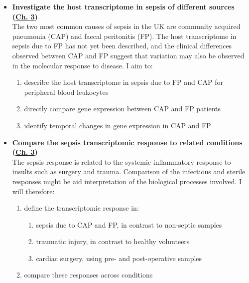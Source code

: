 \begin{itemize}[leftmargin=*]

\item	\textbf{Investigate the host transcriptome in sepsis of different sources 
(\hyperref[ch:Results1]{Ch. 3})} \\
	The two most common causes of sepsis in the UK are community acquired pneumonia (CAP) and faecal peritonitis (FP). The host transcriptome in sepsis due to FP has not yet been described, and the clinical differences observed between CAP and FP suggest that variation may also be observed in the molecular response to disease. I aim to:

		\begin{enumerate}
			\item describe the host transcriptome in sepsis due to FP and CAP for peripheral blood leukocytes
			\item directly compare gene expression between CAP and FP patients
			\item identify temporal changes in gene expression in CAP and FP
		\end{enumerate}

	\item  \textbf{Compare the sepsis transcriptomic response to related conditions 
	(\hyperref[ch:Results1]{Ch. 3})} \\
The sepsis response is related to the systemic inflammatory response to insults such as surgery and trauma. Comparison of the infectious and sterile responses might be aid interpretation of the biological processes involved. I will therefore:
		\begin{enumerate}
				\item define the transcriptomic response in:
					\begin{enumerate}
							\item sepsis due to CAP and FP, in contrast to non-septic samples
							\item traumatic injury, in contrast to healthy volunteers
							\item cardiac surgery, using pre- and post-operative samples
						\end{enumerate}
					\item compare these responses across conditions
				\end{enumerate}
		
\end{itemize} 
